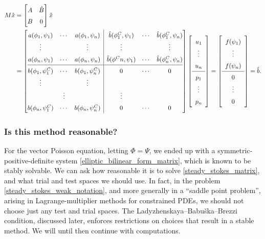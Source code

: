 \begin{equation}\label{steady_stokes_matrix}
\def\arraystretch{1.5}
\begin{split}
    M\hat{x}
    &= \begin{bmatrix}
            A & \hat{B} \\
            B & 0
    \end{bmatrix}\hat{x} \\
    &= \left[\begin{array}{@{}ccc|ccc@{}}
            a(\phi_1, \psi_1) & \cdots & a(\phi_1, \psi_n)     & \hat{b}(\phi^C_1, \psi_1) & \cdots & \hat{b}(\phi^C_1, \psi_n) \\
            \vdots & & \vdots                                  & \vdots & & \vdots \\
            a(\phi_n, \psi_1) & \cdots & a(\phi_n, \psi_n)     & \hat{b}(\phi^Cn, \psi_1) & \cdots & \hat{b}(\phi^C_n, \psi_n) \\
            \hline
            b(\phi_1, \psi^C_1) & \cdots & b(\phi_1, \psi^C_n) & 0 &\cdots& 0      \\
            \vdots & & \vdots \\                               & \vdots & & \vdots \\
            b(\phi_n, \psi^C_1) & \cdots & b(\phi_n, \psi^C_n) & 0 &\cdots& 0       
    \end{array}\right]
    \left[\begin{array}{c} u_1 \\ \vdots \\ u_n \\ \hline p_1 \\ \vdots \\ p_n \end{array}\right]
    =
    \left[\begin{array}{c} f(\psi_1) \\ \vdots \\ f(\psi_{n}) \\ \hline 0 \\ \vdots \\ 0 \end{array}\right]
    = \hat{b}.
\end{split}
\end{equation}
\subsubsection{Is this method reasonable?}
For the vector Poisson equation, letting $\Phi = \Psi$, we ended up with a symmetric-positive-definite system \eqref{elliptic_bilinear_form_matrix}, which is known to be stably solvable.
We can ask how reasonable it is to solve \eqref{steady_stokes_matrix}, and what trial and test spaces we should use.
In fact, in the problem \eqref{steady_stokes_weak_notation}, and more generally in a ``saddle point problem'', arising
in Lagrange-multiplier methods for constrained PDEs, we should not choose just any test and trial spaces.
The Ladyzhenskaya--Babu\v{s}ka--Brezzi condition, discussed later, enforces restrictions on choices that result in a stable method.
We will until then continue with computations.

